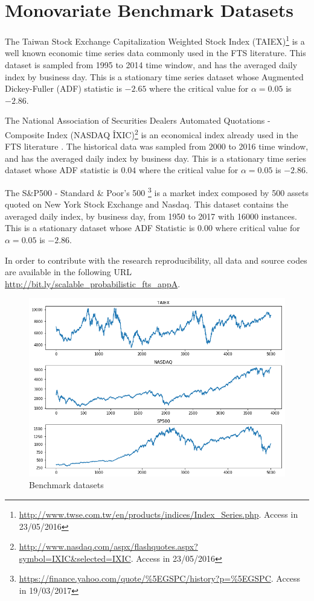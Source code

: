 \chapter{Monovariate Benchmark Datasets}
\label{apd:monovariate_datasets}

The Taiwan Stock Exchange Capitalization Weighted Stock Index (TAIEX)\footnote{\url{http://www.twse.com.tw/en/products/indices/Index_Series.php}. Access in 23/05/2016} is a well known economic time series data commonly used in the FTS literature. This dataset is sampled from 1995 to 2014 time window, and has the averaged daily index by business day. This is a stationary time series dataset whose Augmented Dickey-Fuller (ADF) statistic is $-2.65$ where the critical value for $\alpha = 0.05$ is $-2.86$.


The National Association of Securities Dealers Automated Quotations -  Composite Index (NASDAQ \^IXIC)\footnote{\url{http://www.nasdaq.com/aspx/flashquotes.aspx?symbol=IXIC\&selected=IXIC}. Access in 23/05/2016} is an economical index already used in the FTS literature . The historical data was sampled from 2000 to 2016 time window, and has the averaged daily index by business day. This is a stationary time series dataset whose ADF statistic is $0.04$ where the critical value for $\alpha = 0.05$ is $-2.86$.


The S\&P500 - Standard \& Poor's 500 \footnote{\url{https://finance.yahoo.com/quote/\%5EGSPC/history?p=\%5EGSPC}. Access in 19/03/2017} is a market index composed by 500 assets quoted on New York Stock Exchange and Nasdaq. This dataset contains the averaged daily index, by business day, from 1950 to 2017 with 16000 instances. This is a stationary dataset whose ADF Statistic is 0.00 where critical value for $\alpha = 0.05$ is $-2.86$.

In order to contribute with the research reproducibility, all data and source codes are available in the following URL \url{http://bit.ly/scalable_probabilistic_fts_appA}.

\begin{figure}
    \centering
    \includegraphics[width=\textwidth]{figures/datasets.png}
    \caption{Benchmark datasets}
    \label{fig:datasets}
\end{figure}

